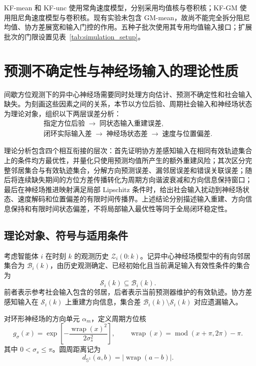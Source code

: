 \documentclass[UTF8,fontset=windows,11pt]{ctexart}
\newcommand{\Sone}{\mathbb S^1}
\begin{document}
KF-mean 和 KF-unc 使用常角速度模型，分别采用均值核与卷积核；KF-GM 使用阻尼角速度模型与卷积核。现有实验未包含 GM-mean，故尚不能完全拆分阻尼均值、协方差展宽和输入门控的作用。五种子批次使用其专用均值输入接口；扩展批次的门限设置见表~\ref{tab:simulation_setup}。

\section{预测不确定性与神经场输入的理论性质}

间歇方位观测下的异中心神经场需要同时处理方向估计、预测不确定性和社会输入缺失。为刻画这些因素之间的关系，本节以方位后验、周期社会输入和神经场状态为理论对象，组织以下两层误差分析：
\[
\begin{gathered}
\text{指定方位后验}\;\longrightarrow\;\text{同状态输入重建误差},\\
\text{闭环实际输入差}\;\longrightarrow\;\text{神经场状态差}\;\longrightarrow\;\text{速度与位置偏差}.
\end{gathered}
\]

理论分析包含四个相互衔接的层次：首先证明协方差感知输入在相同有效轨迹集合上的条件均方最优性，并量化只使用预测均值所产生的额外重建风险；其次区分完整邻居集合与有效轨迹集合，分解方向预测误差、漏邻居误差和错误关联误差；随后将连续缺失期间的方位方差传播转化为周期方向谐波衰减和方向信息保持窗口；最后在神经场推进映射满足局部 Lipschitz 条件时，给出社会输入扰动到神经场状态、速度解码和位置偏差的有限时间传播界。上述结论分别描述输入重建、方向信息保持和有限时间状态偏差，不将局部输入最优性等同于全局闭环稳定性。

\subsection{理论对象、符号与适用条件}

考虑智能体 $i$ 在时刻 $k$ 的观测历史 $\mathcal Z_i(0:k)$。记异中心神经场模型中的有向邻居集合为 $\mathcal B_i(k)$，由历史观测确定、已经初始化且当前满足输入有效性条件的集合为
\[
\mathcal S_i(k)\subseteq\mathcal B_i(k).
\]
前者表示参考社会输入包含的邻居，后者表示当前预测器维护的有效轨迹。协方差感知输入在 $\mathcal S_i(k)$ 上重建方向信息，集合差 $\mathcal B_i(k)\setminus\mathcal S_i(k)$ 对应遗漏输入。

对环形神经场的方向单元 $\alpha_m$，定义周期方位核
\begin{equation}
 g_\sigma(x)=\exp\!\left[-\frac{\operatorname{wrap}(x)^2}{2\sigma_s^2}\right],
 \qquad
 \operatorname{wrap}(x)=\operatorname{mod}(x+\pi,2\pi)-\pi .
 \label{eq:v2_kernel}
\end{equation}
其中 $0<\sigma_s\leq\pi$。圆周距离记为
\begin{equation}
 d_{\Sone}(a,b)=|\operatorname{wrap}(a-b)|.
 \label{eq:v2_circle_distance}
\end{equation}
\end{document}

